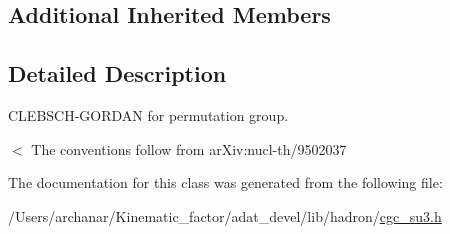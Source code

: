 \subsection*{Additional Inherited Members}


\subsection{Detailed Description}
C\+L\+E\+B\+S\+C\+H-\/\+G\+O\+R\+D\+AN for permutation group. 

$<$ The conventions follow from ar\+Xiv\+:nucl-\/th/9502037 

The documentation for this class was generated from the following file\+:\begin{DoxyCompactItemize}
\item 
/\+Users/archanar/\+Kinematic\+\_\+factor/adat\+\_\+devel/lib/hadron/\mbox{\hyperlink{lib_2hadron_2cgc__su3_8h}{cgc\+\_\+su3.\+h}}\end{DoxyCompactItemize}
